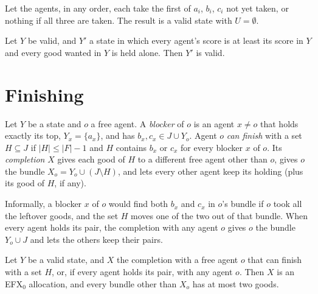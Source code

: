 \documentclass[runningheads,11pt]{llncs}
\newcommand{\efxz}{\texorpdfstring{\mbox{EFX$_0$}}{EFX0}}
\begin{document}
\begin{lemma}\label{lem:draft}
Let the agents, in any order, each take the first of $a_i$, $b_i$, $c_i$ not yet taken, or nothing if all three are taken. The result is a valid state with $U=\emptyset$.
\end{lemma}
\begin{lemma}\label{lem:stay}
Let $Y$ be valid, and $Y'$ a state in which every agent's score is at least its score in $Y$ and every good wanted in $Y$ is held alone. Then $Y'$ is valid.
\end{lemma}
\section{Finishing}\label{sec:finish}

\begin{definition}\label{def:finish}
Let $Y$ be a state and $o$ a free agent. A \emph{blocker} of $o$ is an agent $x\ne o$ that holds exactly its top, $Y_x=\{a_x\}$, and has $b_x,c_x\in J\cup Y_o$. Agent $o$ \emph{can finish} with a set $H\subseteq J$ if $|H|\le|F|-1$ and $H$ contains $b_x$ or $c_x$ for every blocker $x$ of $o$. Its \emph{completion} $X$ gives each good of $H$ to a different free agent other than $o$, gives $o$ the bundle $X_o=Y_o\cup(J\setminus H)$, and lets every other agent keep its holding (plus its good of $H$, if any).
\end{definition}

\noindent Informally, a blocker $x$ of $o$ would find both $b_x$ and $c_x$ in $o$'s bundle if $o$ took all the leftover goods, and the set $H$ moves one of the two out of that bundle. When every agent holds its pair, the completion with any agent $o$ gives $o$ the bundle $Y_o\cup J$ and lets the others keep their pairs.

\begin{theorem}[soundness]\label{thm:sound}
Let $Y$ be a valid state, and $X$ the completion with a free agent $o$ that can finish with a set $H$, or, if every agent holds its pair, with any agent $o$. Then $X$ is an \efxz{} allocation, and every bundle other than $X_o$ has at most two goods.
\end{theorem}
\end{document}
